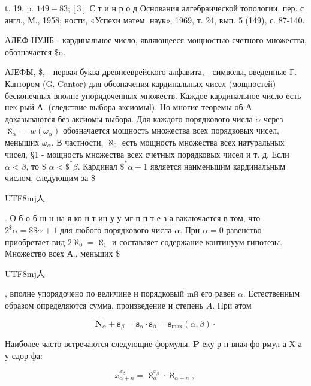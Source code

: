 \documentclass[10pt]{article}
\begin{document}
t. 19, p. $149-83 ;[3]$ С т и н р о д Основания алгебраической топологии, пер. с англ., М., 1958; ности, «Успехи матем. наук», 1969, т. 24, вып. 5 (149), с. 87-140.



АЛЕФ-НУЈІБ - кардинальное число, являющееся мощностью счетного множества, обозначается \$๐.



АЈЕФЫ, \$, - первая буква древнееврейского алфавита, - символы, введенные Г. Кантором (G. Cantor) для обозначения кардинальных чисел (мощностей) бесконечных вполне упорядоченных множеств. Каждое кардинальное число есть нек-рый А. (следствие выбора аксиомыl). Но многие теоремы об А. доказываются без аксиомы выбора. Для каждого порядкового числа $\alpha$ через $\aleph_{\alpha}=w\left(\omega_{\alpha}\right)$ обозначается мощность множества всех порядковых чисел, меныших $\omega_{\alpha}$. В частности, $\aleph_{0}$ есть мощность множества всех натуральных чисел, §1 - мощность множества всех счетных порядковых чисел и т. д. Если $\alpha<\beta$, то \$ $\alpha<\$^{*} \beta$. Кардинал $\$^{*} \alpha+1$ является наименьшим кардинальным числом, следующим за \$\begin{CJK}{UTF8}{mj}人\end{CJK}. О б о б ш н на я ко н т ин у у мг п п т е з а ваключается в том, что $2^{\$} \alpha=\$ \$ \alpha+1$ для любого порядкового числа $\alpha$. При $\alpha=0$ равенство приобретает вид $2 \aleph_{0}=\aleph_{1}$ и составляет содержание континуум-гипотезы. Множество всех А., меньших \$\begin{CJK}{UTF8}{mj}人\end{CJK}, вполне упорядочено по величине и порядковый mй его равен $\alpha$. Естественным образом определяются сумма, произведение и степень $A$. При әтом



\[

\boldsymbol{N}_{\alpha}+\boldsymbol{s}_{\beta}=\boldsymbol{s}_{\alpha} \cdot \boldsymbol{s}_{\beta}=\boldsymbol{s}_{\max }(\alpha, \beta) \cdot

\]



Наиболее часто встречаются следующие формулы. $\mathbf{P}$ еку р п вная фо рмул а Х а у сдор фа:



\[

x_{\alpha+n}^{x_{\beta}}=\aleph_{\alpha}^{x_{\beta}} \cdot \aleph_{\alpha+n} \text {, }

\]
\end{document}
